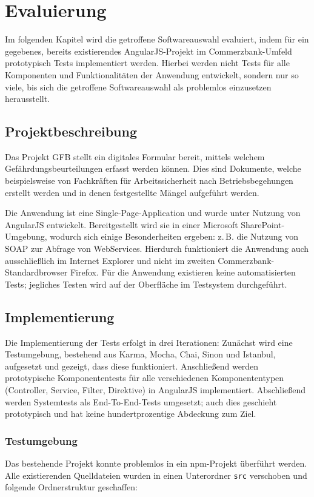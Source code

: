 \section{Evaluierung}
Im folgenden Kapitel wird die getroffene Softwareauswahl evaluiert, indem für ein gegebenes, bereits existierendes AngularJS-Projekt im Commerzbank-Umfeld prototypisch Tests implementiert werden. Hierbei werden nicht Tests für alle Komponenten und Funktionalitäten der Anwendung entwickelt, sondern nur so viele, bis sich die getroffene Softwareauswahl als problemlos einzusetzen herausstellt.

\subsection{Projektbeschreibung}
Das Projekt GFB stellt ein digitales Formular bereit, mittels welchem Gefährdungsbeurteilungen erfasst werden können. Dies sind Dokumente, welche beispielsweise von Fachkräften für Arbeitssicherheit nach Betriebsbegehungen erstellt werden und in denen festgestellte Mängel aufgeführt werden.\cite{gfb}

Die Anwendung ist eine Single-Page-Application und wurde unter Nutzung von AngularJS entwickelt. Bereitgestellt wird sie in einer Microsoft SharePoint-Umgebung, wodurch sich einige Besonderheiten ergeben: z.\,B. die Nutzung von SOAP zur Abfrage von WebServices. Hierdurch funktioniert die Anwendung auch ausschließlich im Internet Explorer und nicht im zweiten Commerzbank-Standardbrowser Firefox. Für die Anwendung existieren keine automatisierten Tests; jegliches Testen wird auf der Oberfläche im Testsystem durchgeführt.\cite{gfb}

\subsection{Implementierung}
Die Implementierung der Tests erfolgt in drei Iterationen: Zunächst wird eine Testumgebung, bestehend aus Karma, Mocha, Chai, Sinon und Istanbul, aufgesetzt und gezeigt, dass diese funktioniert. Anschließend werden prototypische Komponententests für alle verschiedenen Komponententypen (Controller, Service, Filter, Direktive) in AngularJS implementiert. Abschließend werden Systemtests als End-To-End-Tests umgesetzt; auch dies geschieht prototypisch und hat keine hundertprozentige Abdeckung zum Ziel.

\subsubsection{Testumgebung}
Das bestehende Projekt konnte problemlos in ein npm-Projekt überführt werden. Alle existierenden Quelldateien wurden in einen Unterordner \texttt{src} verschoben und folgende Ordnerstruktur geschaffen:
\begin{figure}[H]
\end{figure}

